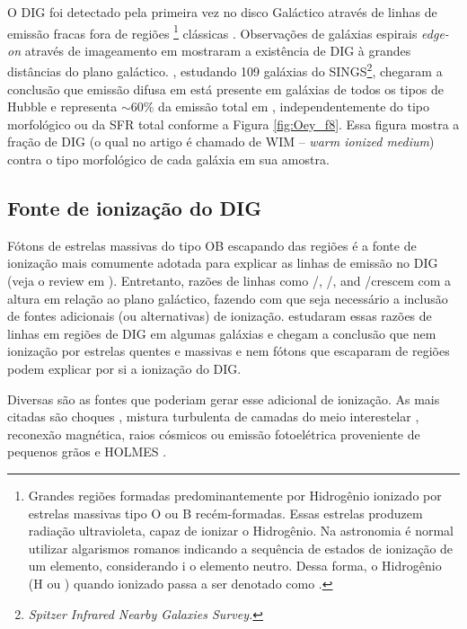 O DIG foi detectado pela primeira vez no disco Galáctico através de linhas de emissão fracas fora de regiões \hii\footnote{Grandes regiões formadas predominantemente por Hidrogênio ionizado por estrelas massivas tipo O ou B recém-formadas. Essas estrelas produzem radiação ultravioleta, capaz de ionizar o Hidrogênio. Na astronomia é normal utilizar algarismos romanos indicando a sequência de estados de ionização de um elemento, considerando {\sc i} o elemento neutro. Dessa forma, o Hidrogênio (H ou \hi) quando ionizado passa a ser denotado como \hii.} clássicas \citep{Reynolds.PhD.1971}. Observações de galáxias espirais {\em edge-on} através de imageamento em \Ha \citep{Dettmar.1990, HoopesWaltGreen.1996, HoopesWaltRand.1999} mostraram a existência de DIG à grandes distâncias do plano galáctico. \cite{Oey.etal.2007}, estudando 109 galáxias do SINGS\footnote{\em Spitzer Infrared Nearby Galaxies Survey.}, chegaram a conclusão que emissão difusa em \Ha está presente em galáxias de todos os tipos de Hubble e representa $\sim60\%$ da emissão total em \Ha, independentemente do tipo morfológico ou da SFR total conforme a Figura \ref{fig:Oey_f8}. Essa figura mostra a fração de DIG (o qual no artigo é chamado de WIM -- {\em warm ionized medium}) contra o tipo morfológico de cada galáxia em sua amostra.

\subsection{Fonte de ionização do DIG}
\label{sec:intro:DIG:source}
Fótons de estrelas massivas do tipo OB escapando das regiões \hii é a fonte de ionização mais comumente adotada para explicar as linhas de emissão no DIG (veja o review em \citealt{Haffner.etal.2009}). Entretanto, razões de linhas como \nii/\Ha, \sii/\Ha, and \oiii/\Hb crescem com a altura em relação ao plano galáctico, fazendo com que seja necessário a inclusão de fontes adicionais (ou alternativas) de ionização. \citet{HoopesWalt.2003} estudaram essas razões de linhas em regiões de DIG em algumas galáxias e chegam a conclusão que nem ionização por estrelas quentes e massivas e nem fótons que escaparam de regiões \hii podem explicar por si a ionização do DIG.

Diversas são as fontes que poderiam gerar esse adicional de ionização. As mais citadas são choques \citep{CollinsRand.2001}, mistura turbulenta de camadas do meio interestelar \citep{SlavinShullBegelman.1993, Binette.etal.2009a}, reconexão magnética, raios cósmicos ou emissão fotoelétrica proveniente de pequenos grãos \citep{Reynolds.etal.2001} e HOLMES \citep{FloresFajardo.etal.2011a}.

